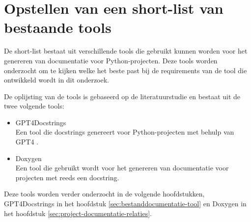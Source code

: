 \begin{table}
    \caption{Requirementsanalyse}
\end{table}

\section{Opstellen van een short-list van bestaande tools}
\label{sec:long-list}
De short-list bestaat uit verschillende tools die gebruikt kunnen worden voor het genereren van documentatie voor Python-projecten.
Deze tools worden onderzocht om te kijken welke het beste past bij de requirements van de tool die ontwikkeld wordt in dit onderzoek.

De oplijsting van de tools is gebaseerd op de literatuurstudie en bestaat uit de twee volgende tools:
\begin{itemize} 
\item GPT4Docstrings \autocite{Trofficus2023}\\
Een tool die docstrings genereert voor Python-projecten met behulp van GPT4 \textcite{OpenAI2023}.
\item Doxygen \autocite{Doxygen2023}\\
Een tool die gebruikt wordt voor het genereren van documentatie voor projecten met reeds een docstring.
\end{itemize}

Deze tools worden verder onderzocht in de volgende hoofdstukken, GPT4Docstrings in het hoofdstuk \ref{sec:bestanddocumentatie-tool} en Doxygen in het hoofdstuk \ref{sec:project-documentatie-relaties}.